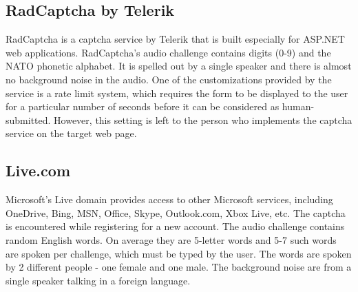 %

\subsection{RadCaptcha by Telerik}

RadCaptcha is a captcha service by Telerik that is built especially for ASP.NET 
web applications. 
RadCaptcha's audio challenge contains digits (0-9) and the NATO phonetic alphabet. It is 
spelled out by a single speaker and there is almost no background noise in the audio. 
One of the customizations provided by the service is a rate limit system, which requires the form to 
be displayed to the user for a particular number of seconds before it can be considered as 
human-submitted. However, this setting is left to the person who implements the captcha 
service on the target web page.

\subsection{Live.com}

Microsoft's Live domain provides access to other Microsoft services, including
 OneDrive, Bing, MSN, Office, Skype, Outlook.com, Xbox Live, etc. The captcha is 
 encountered while registering for a new account. The audio challenge contains random English 
 words. On average they are 5-letter words and 5-7 such words are spoken per challenge, which must be typed by the user.
The words are spoken by 2 different people - one female and one male. The background noise 
are from a single speaker talking in a foreign language.

